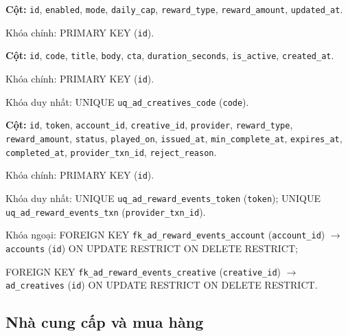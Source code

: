 \begin{description}[leftmargin=3.6cm,labelwidth=3.4cm,style=nextline]

\item[\texttt{ad\_settings}] \textbf{Cột:} \texttt{id}, \texttt{enabled}, \texttt{mode}, \texttt{daily\_cap}, \texttt{reward\_type}, \texttt{reward\_amount}, \texttt{updated\_at}.

Khóa chính: PRIMARY KEY (\texttt{id}).

\item[\texttt{ad\_creatives}] \textbf{Cột:} \texttt{id}, \texttt{code}, \texttt{title}, \texttt{body}, \texttt{cta}, \texttt{duration\_seconds}, \texttt{is\_active}, \texttt{created\_at}.

Khóa chính: PRIMARY KEY (\texttt{id}).

Khóa duy nhất: UNIQUE \texttt{uq\_ad\_creatives\_code} (\texttt{code}).

\item[\texttt{ad\_reward\_events}] \textbf{Cột:} \texttt{id}, \texttt{token}, \texttt{account\_id}, \texttt{creative\_id}, \texttt{provider}, \texttt{reward\_type}, \texttt{reward\_amount}, \texttt{status}, \texttt{played\_on}, \texttt{issued\_at}, \texttt{min\_complete\_at}, \texttt{expires\_at}, \texttt{completed\_at}, \texttt{provider\_txn\_id}, \texttt{reject\_reason}.

Khóa chính: PRIMARY KEY (\texttt{id}).

Khóa duy nhất: UNIQUE \texttt{uq\_ad\_reward\_events\_token} (\texttt{token}); UNIQUE \texttt{uq\_ad\_reward\_events\_txn} (\texttt{provider\_txn\_id}).

Khóa ngoại: FOREIGN KEY \texttt{fk\_ad\_reward\_events\_account} (\texttt{account\_id}) $\rightarrow$ \texttt{accounts} (\texttt{id}) ON UPDATE RESTRICT ON DELETE RESTRICT;\par FOREIGN KEY \texttt{fk\_ad\_reward\_events\_creative} (\texttt{creative\_id}) $\rightarrow$ \texttt{ad\_creatives} (\texttt{id}) ON UPDATE RESTRICT ON DELETE RESTRICT.

\end{description}

\subsection{Nhà cung cấp và mua hàng}

